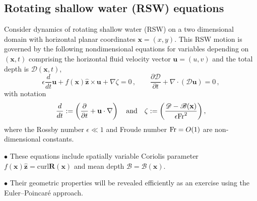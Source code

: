 \documentclass[11pt, oneside]{article}   	%
\numberwithin{equation}{section}
\theoremstyle{plain}
\theoremstyle{definition}
\theoremstyle{remark}
\newcommand{\<}{\langle}
\renewcommand{\>}{\rangle}
\begin{document}
\subsection{Rotating shallow water (RSW) equations} 
Consider dynamics of rotating shallow water (RSW)  
on a two dimensional domain with horizontal planar coordinates $\mathbf{x}=(x,y)$.
This RSW motion is governed by the following nondimensional
equations for variables depending on $(\mathbf{x},t)$ comprising the horizontal fluid velocity vector $\mathbf{u}=(u,v)$ and the total depth is  
$\mathscr{D}(\mathbf{x},t)$,
\small%
\begin{equation}   
\epsilon\frac{d}{dt}\mathbf{u}+ f (\mathbf{x}) \mathbf{\hat{z}} \times\mathbf{u}   
+ \nabla \zeta = 0\, ,   
\qquad 
\frac{\partial \mathscr{D}}{\partial t} + \nabla\cdot ( \mathscr{D}\mathbf{u} )= 0\, ,   
\label{rsw}   
\end{equation}
with notation
\begin{equation*}   
\frac{d}{dt}:=\left(\frac{\partial}{\partial t} + \mathbf{u}\cdot\nabla\right) 
\quad\hbox{and}\quad  
\zeta:=\bigg(\frac{\mathscr{D} - \mathscr{B}(\mathbf{x})}{\epsilon {\rm Fr}^2}\bigg)\, ,
\label{Notation}   
\end{equation*} 
where the Rossby number $\epsilon\ll1$ and Froude number ${\rm Fr}=O(1)$ are non-dimensional constants.
\normalsize%

$\bullet$  These equations include spatially variable Coriolis parameter $f(\mathbf{x})\mathbf{\hat{z}}= \mathrm{curl}\mathbf{R}(\mathbf{x})$ and
mean depth $\mathscr{B}=\mathscr{B}(\mathbf{x})$.
\medskip

$\bullet$  Their geometric properties will be revealed efficiently as an exercise using the Euler--Poincar\'e approach.
\medskip
\end{document}
